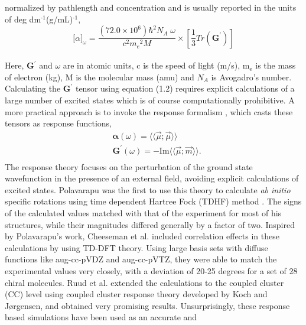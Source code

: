 normalized by pathlength and concentration and is usually reported in the units of deg dm$^{\text{-1}}$(g/mL)$^{\text{-1}}$,\cite{Crawford06}
\\
\begin{equation}
{\lbrack\alpha\rbrack}_{\omega} = \frac{(72.0 \times 10^6){\hbar}^2 N_A\;\omega}{c^2{m_e}^2 M} \times \left[ \frac{1}{3}Tr(\textbf{G}^\prime)\right]
\end{equation}
\\
Here, $\textbf{G}^\prime$ and $\omega$ are in atomic units, c is the speed of light (m/s), m$_{\text{e}}$ is the 
mass of electron (kg), M is the molecular mass (amu) and $N_A$ is Avogadro's number. Calculating the 
$\textbf{G}^\prime$ tensor using equation (1.2) requires explicit calculations of a large number of 
excited states which is of course computationally prohibitive. A more practical approach is to invoke the response formalism
\cite{Koch90,Kobayashi94}, which casts these tensors as response functions,
\begin{equation}
\begin{split}
&\bm{\alpha}(\omega) = \langle\langle\vec{\mu};\vec{\mu}\rangle\rangle\\
&\textbf{G}^{\prime}(\omega) = -\text{Im}\langle\langle\vec{\mu};\vec{m}\rangle\rangle.\\
\end{split}
\end{equation} 
The response theory focuses on the perturbation of the ground state wavefunction in the presence of an external 
field, avoiding explicit calculations of excited states. Polavarapu was the first to use this theory to calculate 
{\em ab initio} specific rotations using time dependent Hartree Fock (TDHF) method \cite{Polavarapu96}. 
The signs of the calculated values matched with that of the experiment for most of his structures, while their magnitudes 
differed generally by a factor of two. Inspired by Polavarapu's work, Cheeseman et al. \cite{Cheeseman00,Stephens01} 
included correlation effects in these calculations by using TD-DFT theory. Using large basis sets with diffuse functions like 
aug-cc-pVDZ and aug-cc-pVTZ,\cite{Dunning89,Kendall92,Woon94} they were able to match the experimental values very closely, with a 
deviation of 20-25 degrees for a set of 28 chiral molecules. Ruud et al. extended the calculations to the coupled cluster (CC)
level using coupled cluster response theory developed by Koch and J{\o}rgensen\cite{Koch90}, and obtained very 
promising results\cite{Ruud03}. Unsurprisingly, these response based simulations have been used as an accurate and 
